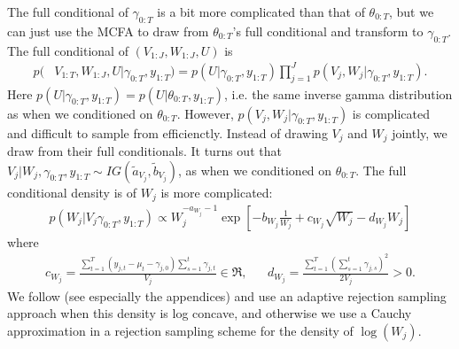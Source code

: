 \documentclass[graybox]{svmult}
\begin{document}
The full conditional of $\gamma_{0:T}$ is a bit more complicated than that of $\theta_{0:T}$, but we can just use the MCFA to draw from $\theta_{0:T}$'s full conditional and transform to $\gamma_{0:T}$. The full conditional of $(V_{1:J},W_{1:J},U)$ is 
\begin{align*}
p(&V_{1:T},W_{1:J},U|\gamma_{0:T},y_{1:T})=p(U|\gamma_{0:T},y_{1:T})\prod_{j=1}^Jp(V_j,W_j|\gamma_{0:T},y_{1:T}).
\end{align*}
Here $p(U|\gamma_{0:T},y_{1:T})=p(U|\theta_{0:T},y_{1:T})$, i.e. the same inverse gamma distribution as when we conditioned on $\theta_{0:T}$. However, $p(V_j,W_j|\gamma_{0:T},y_{1:T})$ is complicated and difficult to sample from efficienctly. Instead of drawing $V_j$ and $W_j$ jointly, we draw from their full conditionals. It turns out that $V_j|W_j,\gamma_{0:T},y_{1:T} \sim IG(\tilde{a}_{V_j},\tilde{b}_{V_j})$, as when we conditioned on $\theta_{0:T}$. The full conditional density is of $W_j$ is more complicated:
\begin{align*}
p(W_j|V_j\gamma_{0:T},y_{1:T}) \propto W_j^{-a_{W_j}-1}\exp\left[-b_{W_j}\frac{1}{W_j} + c_{W_j}\sqrt{W_j} - d_{W_j}W_j\right]
\end{align*}
where
\begin{align*}
c_{W_j}=\frac{\sum_{t=1}^T(y_{j,t} - \mu_t - \gamma_{j,0})\sum_{s=1}^t\gamma_{j,t}}{V_j}\in\Re,&&d_{W_j} = \frac{\sum_{t=1}^T\left(\sum_{s=1}^t\gamma_{j,s}\right)^2}{2V_j} >0.
\end{align*}
We follow \citet{simpson2014interweaving} (see especially the appendices) and use an adaptive rejection sampling approach \citep{gilks1992adaptive} when this density is log concave, and otherwise we use a Cauchy approximation in a rejection sampling scheme for the density of $\log(W_j)$.
\end{document}
